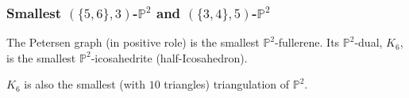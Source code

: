 \documentclass{beamer}
\begin{document}
\begin{frame}\frametitle{Smallest $(\{5,6\},3)$-$\mathbb{P}^2$ and $(\{3,4\},5)$-$\mathbb{P}^2$}
\vspace{-2.5mm}
The Petersen graph (in positive role) is  the smallest 
 $\mathbb{P}^2$-fullerene. Its $\mathbb{P}^2$-dual, $K_6$, is the 
 smallest
 $\mathbb{P}^2$-icosahedrite 
 (half-Icosahedron). 

$K_6$ is also the smallest (with $10$ triangles) triangulation of 
 $\mathbb{P}^2$.

\begin{center}  
\centering
{}\par
\end{center}


\end{frame}
\end{document}
